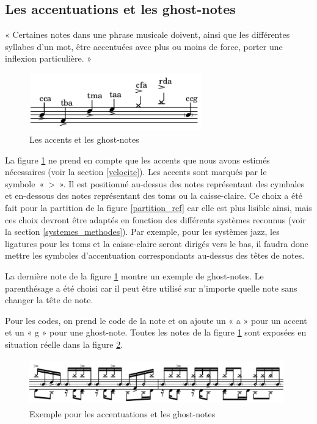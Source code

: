 \subsection*{Les accentuations et les ghost-notes}
« Certaines notes dans une phrase musicale doivent, ainsi que les différentes syllabes d’un mot, être accentuées avec plus ou moins de force, porter une inflexion particulière. » \cite{danhauser}
\begin{figure}[h]
	\centering
	\includegraphics[height=25mm, width=75mm]{z_images/3_methodes/0_notation_de_la_batterie/8_accents_et_ghost-notes_0.png}
	\caption{Les accents et les ghost-notes}
	\label{accents_et_gn}
\end{figure}

La figure \ref{accents_et_gn} ne prend en compte que les accents 
que nous avons estimés nécessaires (voir la section \ref{velocite}). 
Les accents sont marqués par le symbole~«~>~». 
Il est positionné au-dessus des notes représentant des cymbales et en-dessous des notes représentant des toms ou la caisse-claire. Ce choix a été fait pour la partition de la figure \ref{partition_ref} car elle est plus lisible ainsi, mais ces choix devront être adaptés en fonction des différents systèmes reconnus (voir la section \ref{systemes_methodes}). Par exemple, pour les systèmes jazz, les ligatures pour les toms et la caisse-claire seront dirigés vers le bas, il faudra donc mettre les symboles d’accentuation correspondants au-dessus des têtes de notes.

La dernière note de la figure \ref{accents_et_gn} montre un exemple de ghost-notes. 
Le parenthésage a été choisi car il peut être utilisé sur n’importe quelle note sans changer la tête de note.

Pour les codes, 
on prend le code de la note et on ajoute un « a » pour un accent et un « g » pour une ghost-note. Toutes les notes de la figure \ref{accents_et_gn} sont exposées en situation réelle dans la figure \ref{exemple_acc_et_gn}. 
\begin{figure}[h]
	\centering
	\includegraphics[height=20mm, width=110mm]{z_images/3_methodes/0_notation_de_la_batterie/8_accents_et_ghost-notes_1.png}
	\caption{Exemple pour les accentuations et les ghost-notes}
	\label{exemple_acc_et_gn}
\end{figure}
